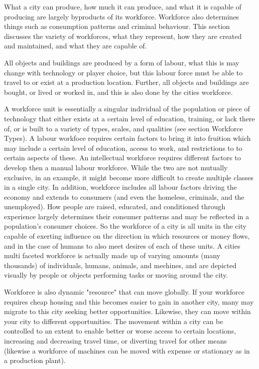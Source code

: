 

What a city can produce, how much it can produce, and what it is capable of producing are largely byproducts of its workforce. Workforce also determines things such as consumption patterns and criminal behaviour. This section discusses the variety of workforces, what they represent, how they are created and maintained, and what they are capable of. 

All objects and buildings are produced by a form of labour, what this is may change with technology or player choice, but this labour force must be able to travel to or exist at a production location. Further, all objects and buildings are bought, or lived or worked in, and this is also done by the cities workforce.

A workforce unit is essentially a singular individual of the population or piece of technology that either exists at a certain level of education, training, or lack there of, or is built to a variety of types, scales, and qualities (see section Workforce Types). A labour workfoce requires certain factors to bring it into fruition which may include a certain level of education, access to work, and restrictions to to certain aspects of these. An intellectual workforce requires different factors to develop then a manual labour workforce. While the two are not mutually exclusive, in an example, it might become more difficult to create multiple classes in a single city. In addition, workforce includes all labour factors driving the economy and extends to consumers (and even the homeless, criminals, and the unemployed). How people are raised, educated, and conditioned through experience largely determines their consumer patterns and may be reflected in a population's consumer choices. So the workforce of a city is all units in the city capable of exerting influence on the direction in which resources or money flows, and in the case of humans to also meet desires of each of these units. A cities multi faceted workforce is actually made up of varying amounts (many thousands) of individuals, humans, animals, and mechines, and are depicted visually by people or objects performing tasks or moving around the city.

Workforce is also dynamic "resource" that can move globally. If your workforce requires cheap housing and this becomes easier to gain in another city, many may migrate to this city seeking better opportunities. Likewise, they can move within your city to different opportunities. The movement within a city can be controlled to an extent to enable better or worse access to certain locations, increasing and decreasing travel time, or diverting travel for other means (likewise a workforce of machines can be moved with expense or stationary as in a production plant). 

